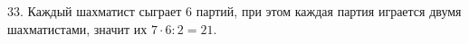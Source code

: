 33. Каждый шахматист сыграет 6 партий, при этом каждая партия играется двумя шахматистами, значит их $7\cdot6:2=21.$\\
